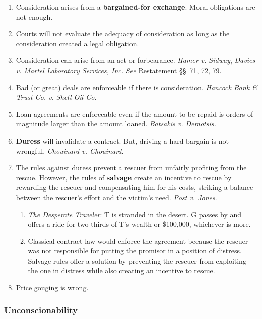 \begin{enumerate}
    \item Consideration arises from a \textbf{bargained-for exchange}. Moral 
    obligations are not enough.
    \item Courts will not evaluate the adequacy of consideration as long as 
    the consideration created a legal obligation.
    \item Consideration can arise from an act or forbearance. \emph{Hamer v. 
    Sidway}, \emph{Davies v. Martel Laboratory Services, Inc.} \emph{See} 
    Restatement \S\S\ 71, 72, 79.
    \item Bad (or great) deals are enforceable if there is consideration. 
    \emph{Hancock Bank \& Trust Co. v. Shell Oil Co.}
    \item Loan agreements are enforceable even if the amount to be repaid is 
    orders of magnitude larger than the amount loaned. \emph{Batsakis v. 
    Demotsis.}
    \item \textbf{Duress} will invalidate a contract. But, driving a hard 
    bargain is not wrongful. \emph{Chouinard v. Chouinard}.
    \item The rules against duress prevent a rescuer from unfairly profiting 
    from the rescue. However, the rules of \textbf{salvage} create an 
    incentive to rescue by rewarding the rescuer and compensating him for his 
    costs, striking a balance between the rescuer's effort and the victim's 
    need. \emph{Post v. Jones}.
    \begin{enumerate}
        \item \emph{The Desperate Traveler}: T is stranded in the desert. G 
        passes by and offers a ride for two-thirds of T's wealth or \$100,000, 
        whichever is more.
        \item Classical contract law would enforce the agreement because the 
        rescuer was not responsible for putting the promisor in a position of 
        distress. Salvage rules offer a solution by preventing the rescuer 
        from exploiting the one in distress while also creating an incentive 
        to rescue.
    \end{enumerate}
    \item Price gouging is wrong.
\end{enumerate}

\subsubsection{Unconscionability}

